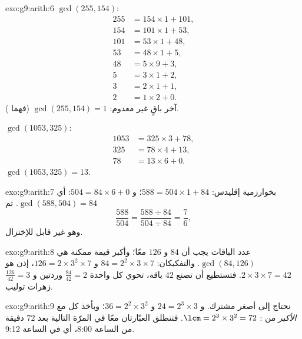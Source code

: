 \begin{solution}{exo:g9:arith:6}
$\gcd(255, 154)$:
\begin{align*}
255 &= 154 \times 1 + 101, \\
154 &= 101 \times 1 + 53, \\
101 &= 53 \times 1 + 48, \\
53 &= 48 \times 1 + 5, \\
48 &= 5 \times 9 + 3, \\
5 &= 3 \times 1 + 2, \\
3 &= 2 \times 1 + 1, \\
2 &= 1 \times 2 + 0 .
\end{align*}
آخر باقٍ غير معدوم: $\gcd(255, 154) = 1$ (فهما ).

$\gcd(1053, 325)$:
\begin{align*}
1053 &= 325 \times 3 + 78, \\
325 &= 78 \times 4 + 13, \\
78 &= 13 \times 6 + 0 .
\end{align*}
$\gcd(1053, 325) = 13$.
\end{solution}

\begin{solution}{exo:g9:arith:7}
بخوارزمية إقليدس: $588 = 504 \times 1 + 84$؛ و $504 = 84 \times 6 + 0$:
أي $\gcd(588, 504) = 84$. ثم
\[
\frac{588}{504} = \frac{588 \div 84}{504 \div 84} = \frac{7}{6},
\]
وهو غير قابل للاِختزال.
\end{solution}

\begin{solution}{exo:g9:arith:8}
عدد الباقات يجب أن  $84$ و $126$ معًا؛ وأكبر قيمة ممكنة هي
$\gcd(84, 126)$. والتفكيكان: $84 = 2^2 \times 3 \times 7$
و $126 = 2 \times 3^2 \times 7$، إذن  هو
$2 \times 3 \times 7 = 42$. فتستطيع أن تصنع $42$ باقة، تحوي كل
واحدة $\frac{84}{42} = 2$ وردتين و $\frac{126}{42} = 3$ زهرات توليب.
\end{solution}

\begin{solution}{exo:g9:arith:9}
نحتاج إلى أصغر  مشترك. و $24 = 2^3 \times 3$
و $36 = 2^2 \times 3^2$؛ وبأخذ كل  مع \emph{الأكبر} من
: $\lcm = 2^3 \times 3^2 = 72$. فتنطلق العبّارتان معًا في
المرّة التالية بعد $72$ دقيقة من الساعة 8:00، أي في الساعة 9:12.
\end{solution}

